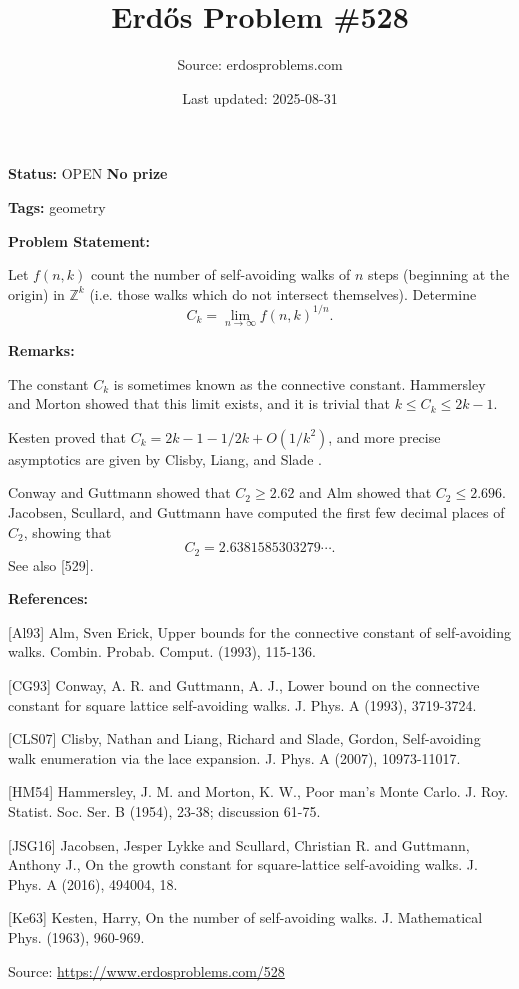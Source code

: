\documentclass{article}
\title{Erd\H{o}s Problem \#528}
\date{Last updated: 2025-08-31}
\author{Source: erdosproblems.com}
\begin{document}
\maketitle

\noindent\textbf{Status:} OPEN \quad \textbf{No prize}

\noindent\textbf{Tags:} geometry

\medskip
\noindent\textbf{Problem Statement:}

Let $f(n,k)$ count the number of self-avoiding walks of $n$ steps (beginning at the origin) in $\mathbb{Z}^k$ (i.e. those walks which do not intersect themselves). Determine\[C_k=\lim_{n\to\infty}f(n,k)^{1/n}.\]

\bigskip
\noindent\textbf{Remarks:}

The constant $C_k$ is sometimes known as the connective constant. Hammersley and Morton \cite{HM54} showed that this limit exists, and it is trivial that $k\leq C_k\leq 2k-1$.

Kesten \cite{Ke63} proved that $C_k=2k-1-1/2k+O(1/k^2)$, and more precise asymptotics are given by Clisby, Liang, and Slade \cite{CLS07}.

Conway and Guttmann \cite{CG93} showed that $C_2\geq 2.62$ and Alm \cite{Al93} showed that $C_2\leq 2.696$. Jacobsen, Scullard, and Guttmann \cite{JSG16} have computed the first few decimal places of $C_2$, showing that\[C_2 = 2.6381585303279\cdots.\]See also [529].

\bigskip
\noindent\textbf{References:}

[Al93] Alm, Sven Erick, Upper bounds for the connective constant of self-avoiding
walks. Combin. Probab. Comput. (1993), 115-136.
 
 [CG93] Conway, A. R. and Guttmann, A. J., Lower bound on the connective constant for square lattice
self-avoiding walks. J. Phys. A (1993), 3719-3724.
 
 [CLS07] Clisby, Nathan and Liang, Richard and Slade, Gordon, Self-avoiding walk enumeration via the lace expansion. J. Phys. A (2007), 10973-11017.
 
 [HM54] Hammersley, J. M. and Morton, K. W., Poor man's Monte Carlo. J. Roy. Statist. Soc. Ser. B (1954), 23-38; discussion 61-75.
 
 [JSG16] Jacobsen, Jesper Lykke and Scullard, Christian R. and
Guttmann, Anthony J., On the growth constant for square-lattice self-avoiding walks. J. Phys. A (2016), 494004, 18.
 
 [Ke63] Kesten, Harry, On the number of self-avoiding walks. J. Mathematical Phys. (1963), 960-969.

\bigskip
\noindent\small{Source: \url{https://www.erdosproblems.com/528}}
\end{document}
